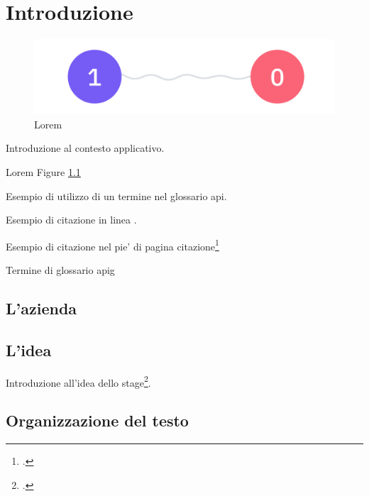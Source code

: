 \chapter{Introduzione}
\label{chap:introduzione}

\begin{figure}[h!]
    \centering
    \includegraphics[width=1\columnwidth]{img/quantum_entanglement.jpeg}
    \caption{Lorem}
    \label{fig:entanglement}
\end{figure}

Introduzione al contesto applicativo.

Lorem Figure \ref{fig:entanglement}

Esempio di utilizzo di un termine nel glossario \gls{api}.

Esempio di citazione in linea
\cite{site:agile-manifesto}.

Esempio di citazione nel pie' di pagina
citazione\footcite{womak:lean-thinking}

Termine di glossario \gls{apig}

\lipsum[1-2]

\section{L'azienda}

\lipsum[1]

\section{L'idea}

Introduzione all'idea dello stage\footcite{article:spooky}.
\lipsum[1-3]

\section{Organizzazione del testo}

